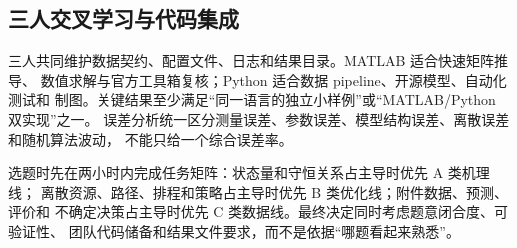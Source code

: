 \subsection{三人交叉学习与代码集成}

三人共同维护数据契约、配置文件、日志和结果目录。MATLAB 适合快速矩阵推导、
数值求解与官方工具箱复核；Python 适合数据 pipeline、开源模型、自动化测试和
制图。关键结果至少满足“同一语言的独立小样例”或“MATLAB/Python 双实现”之一。
误差分析统一区分测量误差、参数误差、模型结构误差、离散误差和随机算法波动，
不能只给一个综合误差率。

选题时先在两小时内完成任务矩阵：状态量和守恒关系占主导时优先 A 类机理线；
离散资源、路径、排程和策略占主导时优先 B 类优化线；附件数据、预测、评价和
不确定决策占主导时优先 C 类数据线。最终决定同时考虑题意闭合度、可验证性、
团队代码储备和结果文件要求，而不是依据“哪题看起来熟悉”。


